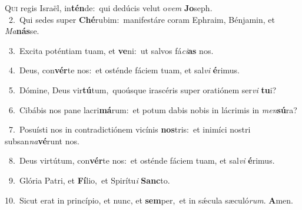 \lettrine{\initial\textcolor{\initialcolor}{Q}}{ui} regis Israël, in\-\textbf{tén}\-de:~\star qui dedúcis velut o\textit{vem} \textbf{Jo}\-seph.\\
{\numbfont\textcolor{\numbcolor}{~2.}}~Qui sedes super \textbf{Ché}\-rubim:~\star manifestáre coram Ephraim, Bénjamin, et \textit{Ma}\-\textbf{nás}se.\par
{\numbfont\textcolor{\numbcolor}{~3.}}~Excita poténtiam tuam, et \textbf{ve}\-ni:~\star ut salvos fá\-\textit{ci}\-\textbf{as} nos.\par
{\numbfont\textcolor{\numbcolor}{~4.}}~Deus, con\-\textbf{vér}\-te nos:~\star et osténde fáciem tuam, et sal\textit{vi} \textbf{é}\-rimus.\par
{\numbfont\textcolor{\numbcolor}{~5.}}~Dómine, Deus vir\-\textbf{tú}\-tum,~\star quoúsque irascéris super oratiónem ser\textit{vi} \textbf{tu}\-i?\par
{\numbfont\textcolor{\numbcolor}{~6.}}~Cibábis nos pane lacri\-\textbf{má}\-rum:~\star et potum dabis nobis in lácrimis in \textit{men}\-\textbf{sú}ra?\par
{\numbfont\textcolor{\numbcolor}{~7.}}~Posuísti nos in contradictiónem vicínis \textbf{nos}\-tris:~\star et inimíci nostri subsan\-\textit{na}\-\textbf{vé}runt nos.\par
{\numbfont\textcolor{\numbcolor}{~8.}}~Deus virtútum, con\-\textbf{vér}\-te nos:~\star et osténde fáciem tuam, et sal\textit{vi} \textbf{é}\-rimus.\par
{\numbfont\textcolor{\numbcolor}{~9.}}~Glória Patri, et \textbf{Fí}\-lio,~\star et Spirítu\textit{i} \textbf{Sanc}\-to.\par
{\numbfont\textcolor{\numbcolor}{10.}}~Sicut erat in princípio, et nunc, et \textbf{sem}\-per,~\star et in sǽcula sæculó\-\textit{rum}\-. \textbf{A}\-men.\par
